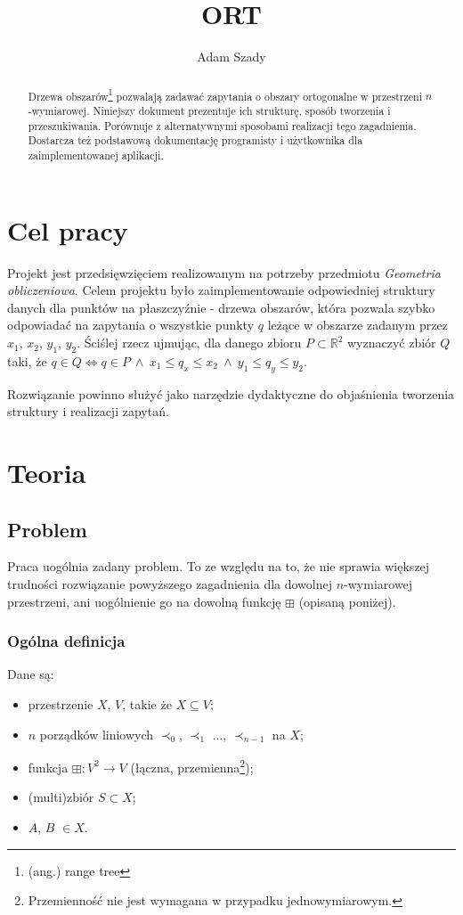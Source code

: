 \documentclass[a4paper]{article}
\title{ORT}
\author{Adam Szady}
\begin{document}
{\let\newpage\relax\maketitle}

\begin{abstract}
Drzewa obszarów\footnote{(ang.) range tree} pozwalają zadawać zapytania o obszary ortogonalne w przestrzeni $n$-wymiarowej. Niniejszy dokument prezentuje ich strukturę, sposób tworzenia i przeszukiwania. Porównuje z alternatywnymi sposobami realizacji tego zagadnienia. Dostarcza też podstawową dokumentację programisty i użytkownika dla zaimplementowanej aplikacji.
\end{abstract}

\section{Cel pracy}
Projekt jest przedsięwzięciem realizowanym na potrzeby przedmiotu \emph{Geometria obliczeniowa}. Celem projektu było zaimplementowanie odpowiedniej struktury danych dla punktów na płaszczyźnie - drzewa obszarów, która pozwala szybko odpowiadać na zapytania o wszystkie punkty $q$ leżące w obszarze zadanym przez $x_1$, $x_2$, $y_1$, $y_2$. Ściślej rzecz ujmując, dla danego zbioru $P \subset \mathbb{R}^2$ wyznaczyć zbiór $Q$ taki, że $q \in Q \iff q \in P\ \land\ x_1 \le q_x \le x_2\ \land\ y_1 \le q_y \le y_2$.

Rozwiązanie powinno służyć jako narzędzie dydaktyczne do objaśnienia tworzenia struktury i realizacji zapytań.

\section{Teoria}
\subsection{Problem}
Praca uogólnia zadany problem. To ze względu na to, że nie sprawia większej trudności rozwiązanie powyższego zagadnienia dla dowolnej $n$-wymiarowej przestrzeni, ani uogólnienie go na dowolną funkcję $\boxplus$ (opisaną poniżej).

\subsubsection*{Ogólna definicja}
Dane są:
\begin{itemize}[noitemsep,topsep=0pt]
\item przestrzenie $X$, $V$, takie że $X \subseteq V$;
\item $n$ porządków liniowych $\prec_0$, $\prec_1$ ..., $\prec_{n-1}$ na $X$;
\item funkcja $\boxplus: V^2 \to V$ (łączna, przemienna\footnote{Przemienność nie jest wymagana w przypadku jednowymiarowym.});
\item (multi)zbiór $S \subset X$;
\item $A$, $B$ $\in X$.
\end{itemize}
\end{document}
